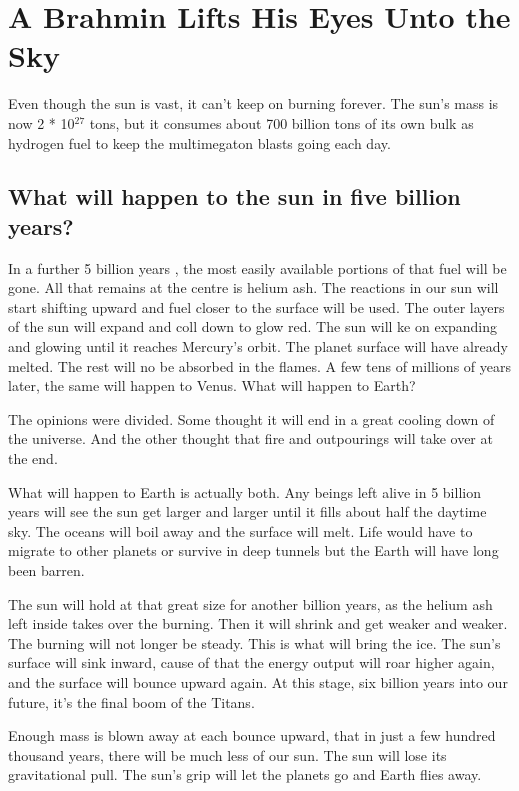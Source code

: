 %

\section{A Brahmin Lifts His Eyes Unto the Sky}

Even though the sun is vast, it can't keep on burning forever. The sun's mass is now 2 * 10$^{27}$ tons, but it consumes about 700 billion tons of its own bulk as hydrogen fuel to keep the multimegaton blasts going each day.

\subsection*{What will happen to the sun in five billion years?}
In a further 5 billion years , the most easily available portions of that fuel will be gone. All that remains at the centre is helium ash. The reactions in our sun will start shifting upward and fuel closer to the surface will be used. The outer layers of the sun will expand and coll down to glow red. The sun will ke on expanding and glowing until it reaches Mercury's orbit. The planet surface will have already melted. The rest will no be absorbed in the flames. A few tens of millions of years later, the same will happen to Venus. What will happen to Earth?

The opinions were divided. Some thought it will end in a great cooling down of the universe. And the other thought that fire and outpourings will take over at the end.

What will happen to Earth is actually both. Any beings left alive in 5 billion years will see the sun get larger and larger until it fills about half the daytime sky. The oceans will boil away and the surface will melt. Life would have to migrate to other planets or survive in deep tunnels but the Earth will have long been barren.

The sun will hold at that great size for another billion years, as the helium ash left inside takes over the burning. Then it will shrink and get weaker and weaker. The burning will not longer be steady. This is what will bring the ice. The sun's surface will sink inward, cause of that the energy output will roar higher again, and the surface will bounce upward again. At this stage, six billion years into our future, it's the final boom of the Titans.

Enough mass is blown away at each bounce upward, that in just a few hundred thousand years, there will be much less of our sun. The sun will lose its gravitational pull. The sun's grip will let the planets go and Earth flies away.

